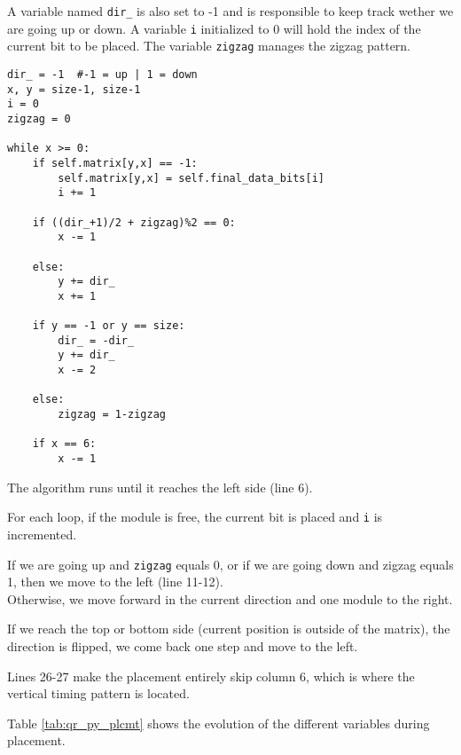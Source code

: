 A variable named \texttt{dir\_} is also set to -1 and is responsible to keep track wether we are going up or down. A variable \texttt{i} initialized to 0 will hold the index of the current bit to be placed. The variable \texttt{zigzag} manages the zigzag pattern.

\begin{verbatim}
dir_ = -1  #-1 = up | 1 = down
x, y = size-1, size-1
i = 0
zigzag = 0

while x >= 0:
    if self.matrix[y,x] == -1:
        self.matrix[y,x] = self.final_data_bits[i]
        i += 1

    if ((dir_+1)/2 + zigzag)%2 == 0:
        x -= 1

    else:
        y += dir_
        x += 1

    if y == -1 or y == size:
        dir_ = -dir_
        y += dir_
        x -= 2

    else:
        zigzag = 1-zigzag

    if x == 6:
        x -= 1
\end{verbatim}

The algorithm runs until it reaches the left side (line 6).

For each loop, if the module is free, the current bit is placed and \texttt{i} is incremented.

If we are going up and \texttt{zigzag} equals 0, or if we are going down and zigzag equals 1, then we move to the left (line 11-12).\\
Otherwise, we move forward in the current direction and one module to the right.

If we reach the top or bottom side (current position is outside of the matrix), the direction is flipped, we come back one step and move to the left.

Lines 26-27 make the placement entirely skip column 6, which is where the vertical timing pattern is located.

Table \ref{tab:qr_py_plcmt} shows the evolution of the different variables during placement.

